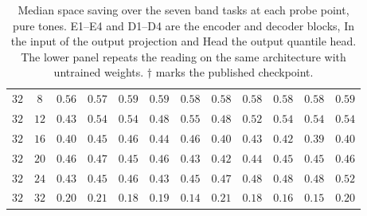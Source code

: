 \begin{table}[!tbp]
\begin{tabular}{@{}ccrrrrrrrrrr@{}}
        \addlinespace[2pt]
        $32$ & $8$ & $0.56$ & $0.57$ & $0.59$ & $0.59$ & $0.58$ & $0.58$ & $0.58$ & $0.58$ & $0.58$ & $0.59$ \\
        $32$ & $12$ & $0.43$ & $0.54$ & $0.54$ & $0.48$ & $0.55$ & $0.48$ & $0.52$ & $0.54$ & $0.54$ & $0.54$ \\
        $32$ & $16$ & $0.40$ & $0.45$ & $0.46$ & $0.44$ & $0.46$ & $0.40$ & $0.43$ & $0.42$ & $0.39$ & $0.40$ \\
        $32$ & $20$ & $0.46$ & $0.47$ & $0.45$ & $0.46$ & $0.43$ & $0.42$ & $0.44$ & $0.45$ & $0.45$ & $0.46$ \\
        $32$ & $24$ & $0.43$ & $0.45$ & $0.46$ & $0.43$ & $0.45$ & $0.47$ & $0.48$ & $0.48$ & $0.48$ & $0.52$ \\
        $32$ & $32$ & $0.20$ & $0.21$ & $0.18$ & $0.19$ & $0.14$ & $0.21$ & $0.18$ & $0.16$ & $0.15$ & $0.20$ \\
        \bottomrule
    \end{tabular}
    \caption{Median space saving over the seven band tasks at each probe point, pure tones. E1--E4 and D1--D4 are the encoder and decoder blocks, In the input of the output projection and Head the output quantile head. The lower panel repeats the reading on the same architecture with untrained weights. $\dagger$ marks the published checkpoint.}
    \label{tab:probingStages}
\end{table}
